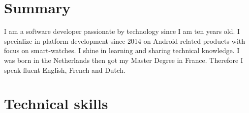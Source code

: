\documentclass[a4paper,10pt,sans]{moderncv}
\begin{document}
\maketitle

\section{Summary}
I am a software developer passionate by technology since I am ten years old.
I specialize in platform development since 2014 on Android related products with focus on smart-watches.
I shine in learning and sharing technical knowledge.
I was born in the Netherlands then got my Master Degree in France.
Therefore I speak fluent English, French and Dutch.

\section{Technical skills}
\begin{cvcolumns}
\end{cvcolumns}
    
\end{document}
